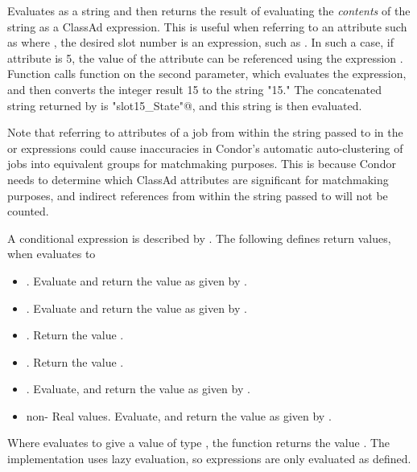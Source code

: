 \begin{description}
  \item[\Code{AnyType eval(AnyType Expr)}]
  Evaluates  as a string and then returns the result of
  evaluating the \emph{contents} of the string as a ClassAd expression.
  This is useful when referring to an attribute such as 
  where , the desired slot number is an expression, such as
  .  
  In such a case, if attribute  is 5,
  the value of the attribute  can
  be referenced using the expression
  .
  Function  calls function 
  on the second parameter, which evaluates the expression,
  and then converts the integer result 15 to the string "15."
  The concatenated string returned by  is
  \verb@"slot15_State"@, and this string is then evaluated.

  Note that referring to attributes of a job from within the string
  passed to  in the  or
   expressions could cause inaccuracies in Condor's
  automatic auto-clustering of jobs into equivalent groups for
  matchmaking purposes.  This is because Condor needs to determine
  which ClassAd attributes are significant for matchmaking purposes,
  and indirect references from within the string passed to 
  will not be counted.

  \item[\Code{AnyType ifThenElse(AnyType IfExpr,AnyType ThenExpr, AnyType ElseExpr)}]
    A conditional expression is described by .
    The following defines return values, when 
    evaluates to
    \begin{itemize}
    \item{. Evaluate and return the value as given
      by .}
    \item{. Evaluate and return the value as given
      by .}
    \item{. Return the value .}
    \item{. Return the value .}
    \item{. Evaluate, and return the value as given
      by .}
    \item{non- Real values. Evaluate, and return the value as given
      by .}
    \end{itemize}
    Where  evaluates to give a value of type ,
    the function returns the value .
    The implementation uses lazy evaluation, so expressions
    are only evaluated as defined.


\end{description}
